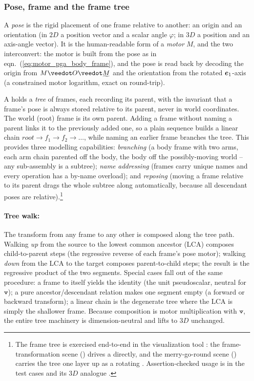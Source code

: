 \subsubsection{Pose, frame and the frame tree}
\label{subsubsection:pose_frame_tree}

A \emph{pose} is the rigid placement of one frame relative to another: an origin and an
orientation (in $2D$ a position vector and a scalar angle $\varphi$; in $3D$ a position
and an axis-angle vector). It is the human-readable form of a \emph{motor} $M$, and the
two interconvert: the motor is built from the pose as in
eqn.~(\ref{eq:motor_pga_body_frame}), and the pose is read back by decoding the origin
from $M \veedot O \veedot \rrev{M}$ and the orientation from the rotated $\bm{e}_{1}$-axis (a
constrained motor logarithm, exact on round-trip).

A  holds a \emph{tree} of frames, each recording its parent, with
the invariant that a frame's pose is always stored relative to its parent, never in
world coordinates. The world (root) frame is its own parent. Adding a
frame without naming a parent links it to the previously added one, so a plain sequence
builds a linear chain $\textit{root} \to f_1 \to f_2 \to \dots$, while naming an earlier
frame branches the tree. This provides three modelling capabilities: \emph{branching}
(a body frame with two arms, each arm chain parented off the body, the body off the
possibly-moving world -- any sub-assembly is a subtree); \emph{name addressing} (frames
carry unique names and every operation has a by-name overload); and \emph{reposing}
(moving a frame relative to its parent drags the whole subtree along automatically,
because all descendant poses are relative).\footnote{The frame tree is exercised
end-to-end in the visualization tool : the frame-transformation scene
() drives a  directly, and the
merry-go-round scene () carries the tree one layer
up as a rotating . Assertion-checked usage is in the test cases
 and its $3D$ analogue
.}

\paragraph{Tree walk:} The transform from any frame to any other is composed along the
tree path. Walking
\emph{up} from the source to the lowest common ancestor (LCA) composes child-to-parent
steps (the regressive reverse of each frame's pose motor); walking \emph{down} from the
LCA to the target composes parent-to-child steps; the result is the regressive product of
the two segments. Special cases fall out of the same procedure: a frame to itself yields
the identity (the unit pseudoscalar, neutral for $\veedot$); a pure ancestor/descendant
relation makes one segment empty (a forward or backward transform); a linear chain is the
degenerate tree where the LCA is simply the shallower frame. Because composition is motor
multiplication with $\veedot$, the entire tree machinery is dimension-neutral and lifts to
$3D$ unchanged.

